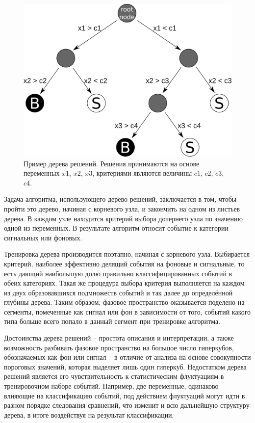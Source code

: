 \documentclass[14pt]{extarticle}
\begin{document}
\begin{figure}[h!]
	\centering
	\includegraphics[width=0.7\linewidth]{../pics/decision.png}
	\caption{Пример дерева решений. Решения принимаются на основе переменных $x1$, $x2$, $x3$, критериями являются величины $c1$, $c2$, $c3$, $c4$.}
	\label{fig:dectree}
\end{figure}

Задача алгоритма, использующего дерево решений, заключается в том, чтобы пройти это дерево, начиная с корневого узла, и закончить на одном из листьев дерева. В каждом узле находится критерий выбора дочернего узла по значению одной из переменных. В результате алгоритм относит событие к категории сигнальных или фоновых.

Тренировка дерева производится поэтапно, начиная с корневого узла. Выбирается критерий, наиболее эффективно делящий события на фоновые и сигнальные, то есть дающий наибольшую долю правильно классифицированных событий в обеих категориях. Такая же процедура выбора критерия выполняется на каждом из двух образовавшихся подмножеств событий и так далее до определённой глубины дерева. Таким образом, фазовое пространство оказывается поделено на сегменты, помеченные как сигнал или фон в зависимости от того, событий какого типа больше всего попало в данный сегмент при тренировке алгоритма.

Достоинства дерева решений -- простота описания и интерпретации, а также возможность разбивать фазовое пространство на большое число гиперкубов, обозначаемых как фон или сигнал -- в отличие от анализа на основе совокупности пороговых значений, которая выделяет лишь один гиперкуб. Недостатком дерева решений является его чувствительность к статистическим флуктуациям в тренировочном наборе событий. Например, две переменные, одинаково влияющие на классификацию событий, под действием флуктуаций могут идти в разном порядке следования сравнений, что изменит и всю дальнейшую структуру дерева, в итоге воздействуя на результат классификации.
\end{document}
